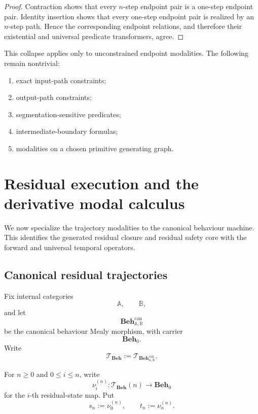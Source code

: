 \begin{proof}
Contraction shows that every \(n\)-step endpoint pair is a one-step endpoint
pair. Identity insertion shows that every one-step endpoint pair is realized
by an \(n\)-step path. Hence the corresponding endpoint relations, and
therefore their existential and universal predicate transformers, agree.
\end{proof}

This collapse applies only to unconstrained endpoint modalities. The
following remain nontrivial:
\begin{enumerate}
    \item exact input-path constraints;
    \item output-path constraints;
    \item segmentation-sensitive predicates;
    \item intermediate-boundary formulas;
    \item modalities on a chosen primitive generating graph.
\end{enumerate}

\section{Residual execution and the derivative modal calculus}
\label{sec:residual-execution-derivative-modal-calculus}

We now specialize the trajectory modalities to the canonical behaviour
machine. This identifies the generated residual closure and residual safety
core with the forward and universal temporal operators.

\subsection{Canonical residual trajectories}
\label{subsec:canonical-residual-trajectories}

Fix internal categories
\[
    \mathbb A,
    \qquad
    \mathbb B,
\]
and let
\[
    \mathbf{Beh}^{\mathrm{can}}_{\mathbb A,\mathbb B}
\]
be the canonical behaviour Mealy morphism, with carrier
\[
    \mathbf{Beh}_0.
\]
Write
\[
    \mathscr T_{\mathbf{Beh}}
    :=
    \mathscr T_{
        \mathbf{Beh}^{\mathrm{can}}_{\mathbb A,\mathbb B}
    }.
\]

For \(n\geq0\) and \(0\leq i\leq n\), write
\[
    \nu_i^{(n)}:
    \mathscr T_{\mathbf{Beh}}(n)
    \to
    \mathbf{Beh}_0
\]
for the \(i\)-th residual-state map. Put
\[
    s_n:=\nu_0^{(n)},
    \qquad
    t_n:=\nu_n^{(n)}.
\]

